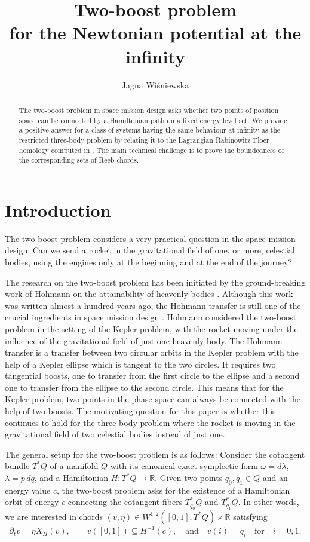 \documentclass[a4paper]{amsart}
\title{Two-boost problem\\ for the Newtonian potential at the infinity}
\author{Jagna Wi\'{s}niewska }
\numberwithin{equation}{section}
\newcommand{\R}{\mathbb{R}}
\begin{document}
\maketitle

\begin{abstract}
The two-boost problem in space mission design asks whether two
points of position space can be connected by a Hamiltonian path on a fixed energy level set. We provide a positive answer for a class of systems having the same behaviour at infinity as the restricted three-body problem by relating it to the Lagrangian Rabinowitz Floer homology computed in \cite{Wisniewska2024}. The main technical challenge is to prove the boundedness of the corresponding sets of Reeb chords.
\end{abstract}


\section{Introduction}
The two-boost problem considers a very practical question in the space mission design:
Can we send a rocket in the gravitational field of one, or more, celestial bodies, using the engines only at the beginning and at the end of the journey?

The research on the two-boost problem has been initiated by the ground-breaking work of Hohmann on the attainability of heavenly bodies \cite{Hohmann}. Although this work was written almost a hundred years ago, the Hohmann transfer is still one of the crucial ingredients in space mission design \cite{Vallado}. Hohmann considered the two-boost problem in the setting of the Kepler problem, with the rocket moving under the influence of the gravitational field of just one heavenly body. The Hohmann transfer is a transfer between two circular orbits in the Kepler problem with the help of a Kepler ellipse which is tangent to the two circles. It requires two tangential boosts, one to transfer from the first circle to the ellipse and a second one to transfer from the ellipse to the second circle. This means that for the Kepler problem, two points in the
phase space can always be connected with the help of two boosts. The motivating
question for this paper is whether this continues to hold for the three body problem where the rocket is moving in the gravitational field of two celestial bodies instead of just one.

The general setup for the two-boost problem is as follows: Consider the cotangent bundle $T^*Q$ of a manifold $Q$ with its canonical exact symplectic form $\omega=d\lambda$, $\lambda=p\,dq$, and a Hamiltonian $H:T^*Q\to\R$. Given two points $q_0,q_1\in Q$ and an energy value $c$, the two-boost problem asks for the existence of a Hamiltonian orbit of energy $c$ connecting the cotangent fibers $T_{q_0}^*Q$ and $T_{q_1}^*Q$. In other words, we are interested in chords $(v,\eta)\in W^{1,2}([0,1], T^*Q)\times\R$ satisfying
\begin{equation}\label{Def(v,eta)}
\partial_tv=\eta X_H(v),\qquad v([0,1])\subseteq H^{-1}(c),\quad \textrm{and}\quad v(i)=q_i\quad \textrm{for}\quad i=0,1.
\end{equation}
\end{document}
